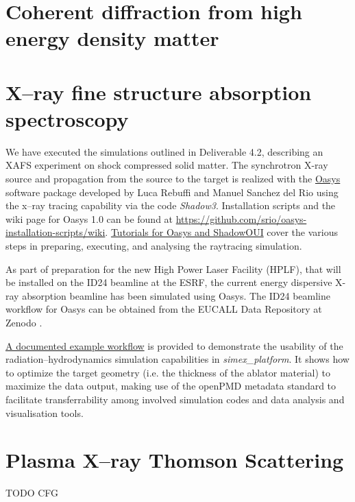 \documentclass[12pt]{scrartcl}
\begin{document}
\section{Coherent diffraction from high energy density matter}\label{sec:plasma_diffraction}


\section{X--ray fine structure absorption spectroscopy\label{sec:xafs}}
%
We have executed the simulations outlined in Deliverable
4.2\cite{EUCALL_SIMEX_D4.2}, describing an XAFS experiment on shock compressed
solid matter.
The synchrotron X-ray source and propagation from the source to the target is
realized with the \href{http://ftp.esrf.eu/pub/scisoft/Oasys/readme.html}{Oasys}
software package developed by Luca Rebuffi and Manuel Sanchez del Rio
 using the x--ray tracing
capability via the code \textit{Shadow3}. Installation scripts and the wiki page for Oasys 1.0 can be
found at
\href{https://github.com/srio/oasys-installation-scripts/wiki}{https://github.com/srio/oasys-installation-scripts/wiki}.
\href{https://github.com/srio/ShadowOui-Tutorial}{Tutorials for
Oasys and ShadowOUI} cover the various steps in preparing, executing, and
analysing the raytracing simulation.

As part of preparation for the new High Power
Laser Facility (HPLF), that will be installed on the ID24 beamline at the ESRF,
the current energy dispersive X-ray absorption beamline has been simulated using
Oasys.
The ID24 beamline workflow for Oasys can be obtained from the EUCALL Data
Repository at Zenodo \cite{Briggs2017.zenodo.886451}.



\href{https://www.github.com/eucall-software/simex_platform/wiki/Esther-Hydrocode-Tutorial}{A
documented example workflow} is provided to demonstrate the usability of the
radiation--hydrodynamics simulation capabilities in \textit{simex\_platform}. It
shows how to optimize the target geometry (i.e. the thickness of the ablator
material) to maximize the data output, making use of the openPMD metadata
standard to facilitate transferrability among involved simulation codes and
data analysis and visualisation tools.

\section{Plasma X--ray Thomson Scattering\label{sec:xrts}}
TODO CFG
%
\end{document}
